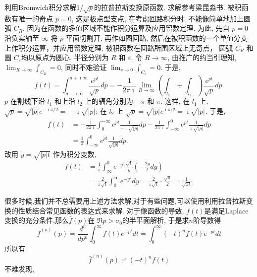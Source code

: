 \begin{examplebox}{利用Bromwich积分求解$1/\sqrt{p}$的拉普拉斯变换原函数.}
    求解参考梁昆淼书.
    被积函数有唯一的奇点 $p=0$, 这是极点型支点, 在考虑回路积分时, 
    不能像简单地加上圆弧 $C_R$, 因为在函数的多值区域不能作积分运算及应用留数定理. 
    为此, 先自 $p=0$ 沿负实轴至 $\infty$ 将 $p$ 平面切割开,
    再作如图回路, 然后在被积函数的一个单值分支上作积分运算，并应用留数定理. 
    被积函数在回路所围区域上无奇点，
     圆弧 $C_R$ 和圆 $C_{\varepsilon}$均以原点为圆心, 
     半径分别为 $R$ 和 $\varepsilon$. 令 $R \rightarrow \infty$, 
     由推广的约当引理知, $\lim _{R \rightarrow \infty} \int_{C_R}=0$, 
     同时不难验证 $\lim _{s \rightarrow 0} \int_{C_s}=0$.
     于是,
$$
f(t)=\int_{a-\imath \infty}^{a+\imath \infty} \frac{e^{p t}}{\sqrt{p}} d p=-\frac{1}{2 \pi \imath} \lim _{R \rightarrow \infty}\left(\int_{l_1}+\int_{l_2}\right) \frac{e^{p t}}{\sqrt{p}} d p .
$$
$p$ 在割线下沿 $l_1$ 和上沿 $l_2$ 上的辐角分别为 $-\pi$ 和 $\pi$. 这样, 在 $l_1$ 上, $\sqrt{p}=\sqrt{|p|} e^{-\imath \pi / 2}=$ $-\imath \sqrt{|p|}$; 在 $l_2$ 上 $\sqrt{p}=\sqrt{|p|} e^{\imath \pi / 2}=\imath \sqrt{|p|}$. 于是,
$$
\begin{aligned}
f(t) & =-\frac{1}{2 \pi \imath} \int_0^{-\infty} e^{p t} \frac{1}{-\imath \sqrt{|p|}} d p-\frac{1}{2 \pi \imath} \int_{-\infty}^0 e^{p t} \frac{1}{\imath \sqrt{|p|}} d p \\
& =\frac{1}{\pi} \int_{-\infty}^0 e^{p t} \frac{1}{\sqrt{|p|}} d p .
\end{aligned}
$$
改用 $y=\sqrt{|p| t}$ 作为积分变数,
$$
\begin{aligned}
f(t) & =\frac{1}{\pi} \int_{\infty}^0 e^{-y^2} \frac{\sqrt{t}}{y}\left(-\frac{2 y}{t} d y\right) \\
& =\frac{2}{\pi \sqrt{t}} \int_0^{\infty} e^{-y^2} d y=\frac{2}{\pi \sqrt{t}} \cdot \frac{\sqrt{\pi}}{2}=\frac{1}{\sqrt{\pi t}} .
\end{aligned}
$$
\end{examplebox}

很多时候,我们并不总需要用上述方法求解,对于有些问题,可以使用利用拉普拉斯变换的性质结合常见函数的表达式来求解.
对于像函数的导数, $f(t)$是满足Laplace变换的充分条件,那么$\bar{f}(p)$在
$\Re p > \sigma_0$的半平面解析,
于是求$n$阶导数得
\begin{equation}
\bar{f}^{(n)}(p)=\frac{d^{n}}{d p^n} \int_0^{\infty} f(t) e^{-p t} d t=\int_0^{\infty}(-t)^n f(t) e^{-p t} d t
\end{equation}
所以有
\begin{equation}
    \bar{f}^{(n)}(p)\risingdotseq (-t)^n f(t)
\end{equation}
不难发现,

